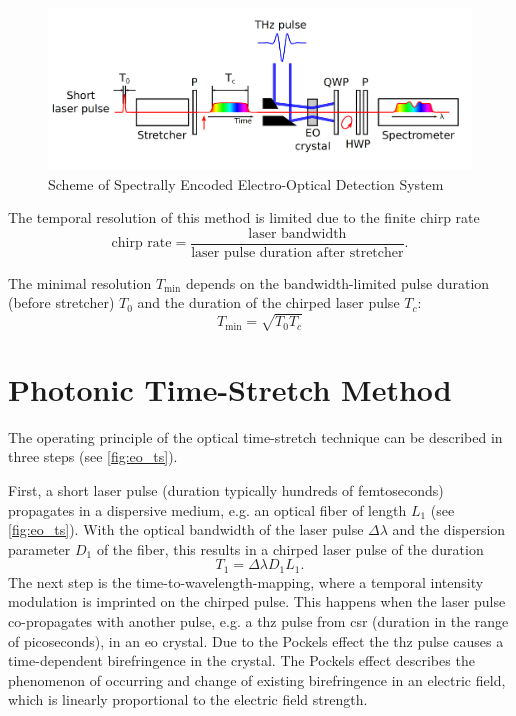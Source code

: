 \begin{figure}[tb]
	\centering
	\includegraphics[width = \textwidth]{chap/02-theory/img/bd/spectral_eo}
	\caption{Scheme of Spectrally Encoded Electro-Optical Detection System \cite{roussel2014}}
	\label{fig:spectral_eo}
\end{figure}

The temporal resolution of this method is limited due to the finite chirp rate
\begin{equation}
	\text{chirp rate} = \frac{\text{laser bandwidth}}{\text{laser pulse duration after stretcher}}.
\end{equation}

The minimal resolution $T_{\text{min}}$ depends on the bandwidth-limited pulse duration (before stretcher) $T_0$ and the duration of the chirped laser pulse $T_c$:
\begin{equation}
	T_{\text{min}} = \sqrt{T_0 T_c}
\end{equation}


\section{Photonic Time-Stretch Method}
The operating principle of the optical time-stretch technique can be described in three steps (see \autoref{fig:eo_ts}).

First, a short laser pulse (duration typically hundreds of femtoseconds) propagates in a dispersive medium, e.g. an optical fiber of length $L_1$ (see \autoref{fig:eo_ts}).
With the optical bandwidth of the laser pulse $\Delta \lambda$ and the dispersion parameter $D_1$ of the fiber, this results in a chirped laser pulse of the duration
\begin{equation}
	T_1 = \Delta \lambda D_1 L_1.
\end{equation}
The next step is the time-to-wavelength-mapping, where a temporal intensity modulation is imprinted on the chirped pulse.
This happens when the laser pulse co-propagates with another pulse, e.g. a \gls{thz} pulse from \gls{csr} (duration in the range of picoseconds), in an \gls{eo} crystal. 
Due to the Pockels effect the \gls{thz} pulse causes a time-dependent birefringence in the crystal. 
The Pockels effect describes the phenomenon of occurring and change of existing birefringence in an electric field, which is linearly proportional to the electric field strength. \cite{pockels} 


